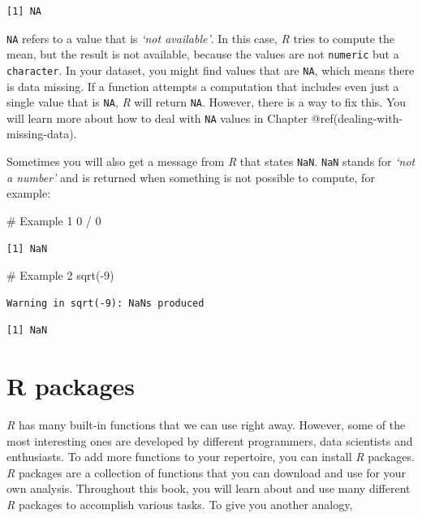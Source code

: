 \documentclass[
  letterpaper,
]{krantz}
\makeatletter
\newenvironment{Shaded}{\begin{snugshade}}{\end{snugshade}}
\newcommand{\CommentTok}[1]{\textcolor[rgb]{0.37,0.37,0.37}{#1}}
\newcommand{\DecValTok}[1]{\textcolor[rgb]{0.68,0.00,0.00}{#1}}
\newcommand{\FunctionTok}[1]{\textcolor[rgb]{0.28,0.35,0.67}{#1}}
\newcommand{\NormalTok}[1]{\textcolor[rgb]{0.00,0.23,0.31}{#1}}
\newcommand{\SpecialCharTok}[1]{\textcolor[rgb]{0.37,0.37,0.37}{#1}}
\newenvironment{kframe}{%
\medskip{}
\setlength{\fboxsep}{.8em}
 \def\at@end@of@kframe{}%
 \ifinner\ifhmode%
  \def\at@end@of@kframe{\end{minipage}}%
  \begin{minipage}{\columnwidth}%
 \fi\fi%
 \def\FrameCommand##1{\hskip\@totalleftmargin \hskip-\fboxsep
 \colorbox{shadecolor}{##1}\hskip-\fboxsep
     \hskip-\linewidth \hskip-\@totalleftmargin \hskip\columnwidth}%
 \MakeFramed {\advance\hsize-\width
   \@totalleftmargin\z@ \linewidth\hsize
   \@setminipage}}%
 {\par\unskip\endMakeFramed%
 \at@end@of@kframe}
\renewenvironment{Shaded}{\begin{kframe}}{\end{kframe}}
\makeatother
\begin{document}
\begin{verbatim}
[1] NA
\end{verbatim}

\texttt{NA} refers to a value that is \emph{`not available'}. In this
case, \emph{R} tries to compute the mean, but the result is not
available, because the values are not \texttt{numeric} but a
\texttt{character}. In your dataset, you might find values that are
\texttt{NA}, which means there is data missing. If a function attempts a
computation that includes even just a single value that is \texttt{NA},
\emph{R} will return \texttt{NA}. However, there is a way to fix this.
You will learn more about how to deal with \texttt{NA} values in Chapter
@ref(dealing-with-missing-data).

Sometimes you will also get a message from \emph{R} that states
\texttt{NaN}. \texttt{NaN} stands for \emph{`not a number'} and is
returned when something is not possible to compute, for example:

\begin{Shaded}
\begin{Highlighting}[]
\CommentTok{\# Example 1}
\DecValTok{0} \SpecialCharTok{/} \DecValTok{0}
\end{Highlighting}
\end{Shaded}

\begin{verbatim}
[1] NaN
\end{verbatim}

\begin{Shaded}
\begin{Highlighting}[]
\CommentTok{\# Example 2}
\FunctionTok{sqrt}\NormalTok{(}\SpecialCharTok{{-}}\DecValTok{9}\NormalTok{)}
\end{Highlighting}
\end{Shaded}

\begin{verbatim}
Warning in sqrt(-9): NaNs produced
\end{verbatim}

\begin{verbatim}
[1] NaN
\end{verbatim}

\section{R packages}\label{r-packages}

\emph{R} has many built-in functions that we can use right away.
However, some of the most interesting ones are developed by different
programmers, data scientists and enthusiasts. To add more functions to
your repertoire, you can install \emph{R} packages. \emph{R} packages
are a collection of functions that you can download and use for your own
analysis. Throughout this book, you will learn about and use many
different \emph{R} packages to accomplish various tasks. To give you
another analogy,
\end{document}
